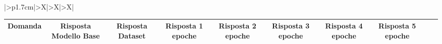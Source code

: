 \documentclass{article}
\begin{document}
\renewcommand{\arraystretch}{1.7}  %

\begin{table}[ht]
\centering
\begin{tabularx}{\textwidth}{|>{\centering{}}p{1.7cm}|>{\centering\arraybackslash}X|>{\centering\arraybackslash}X|>{\centering\arraybackslash}X|}   %
\hline
{}  %
\hline
\begin{tabular}{|c|c|c|c|c|c|c|c|c|c|}
\hline
Domanda & Risposta Modello Base & Risposta Dataset & Risposta 1 epoche & Risposta 2 epoche & Risposta 3 epoche & Risposta 4 epoche & Risposta 5 epoche \\
\hline

\end{tabular}
\end{tabularx}
\end{table}
\end{document}
